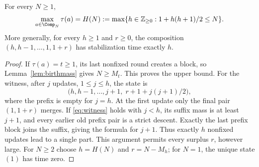 \begin{theorem}\label{thm:clock}
For every $N\ge1$,
\[
 \max_{a\in\Comp_N}\tau(a)
 = H(N):=\max\{h\in\mathbb Z_{\ge0}:1+h(h+1)/2\le N\}.
\]
More generally, for every $h\ge1$ and $r\ge0$, the composition
$(h,h-1,\ldots,1,1+r)$ has stabilization time exactly $h$.
\end{theorem}
\begin{proof}
If $\tau(a)=t\ge1$, its last nonfixed round creates a block, so
Lemma~\ref{lem:birthmass} gives $N\ge M_t$. This proves the upper bound.
For the witness, after $j$ updates, $1\le j\le h$, the state is
\begin{equation}\label{eq:witness}
 \bigl(h,h-1,\ldots,j+1,\;r+1+j(j+1)/2\bigr),
\end{equation}
where the prefix is empty for $j=h$. At the first update only the final
pair $(1,1+r)$ merges. If \eqref{eq:witness} holds with $j<h$, its suffix
mass is at least $j+1$, and every earlier old prefix pair is a strict
descent. Exactly the last prefix block joins the suffix, giving the formula
for $j+1$. Thus exactly $h$ nonfixed updates lead to a single part. This
argument permits every surplus $r$, however large. For $N\ge2$ choose
$h=H(N)$ and $r=N-M_h$; for $N=1$, the unique state $(1)$ has time zero.
\end{proof}
